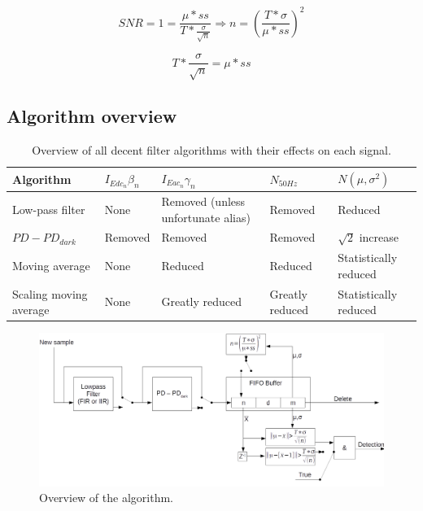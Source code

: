 \begin{equation}
\label{eq:SNR}
SNR = 1 = \frac{\mu * ss}{T * \frac{\sigma}{\sqrt{n}}} \Rightarrow n = \left(\frac{T * \sigma}{\mu*ss}\right)^2
\end{equation}

\begin{equation}
\label{SNR_2}
T * \frac{\sigma}{\sqrt{n}} = \mu * ss
\end{equation}




\subsection{Algorithm overview}
\begin{table}
	\centering
	\label{tab:Filters_summarized}
	\begin{tabular}{lllll}
		\hline
		Algorithm             &\vline $I_{Edc_{n}} \beta_{n}$ & $I_{Eac{_n}} \gamma_{n}$           & $N_{50Hz} $     & $N(\mu,\sigma^2)$    \\ \hline
		Low-pass filter       &\vline None                    & Removed (unless unfortunate alias) & Removed      & Reduced              \\
		$PD - PD_{dark}$      &\vline Removed                 & Removed                            & Removed         & $\sqrt2$ increase    \\
		Moving average        &\vline None                    & Reduced                            & Reduced         & Statistically reduced\\
		Scaling moving average&\vline None                    & Greatly reduced                    & Greatly reduced & Statistically reduced\\ \hline
	\end{tabular}
	\caption{Overview of all decent filter algorithms with their effects on each signal.}
\end{table}

\begin{figure}
	\includegraphics[angle=90,width=\textwidth]{pics/allSTDbasedAlgorithms_expanded.png}
	\caption{Overview of the algorithm.}
	\label{fig:fullAlgorithm}
\end{figure}
